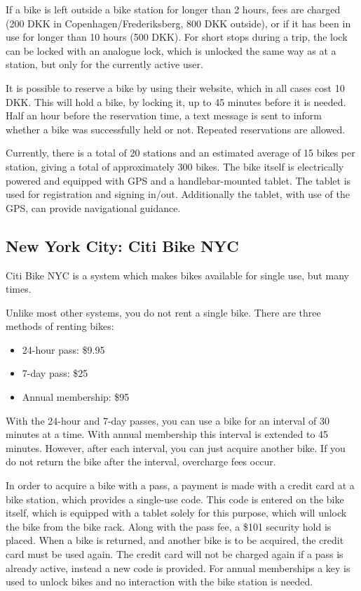 If a bike is left outside a bike station for longer than 2 hours, fees are charged (200 DKK in Copenhagen/Frederiksberg, 800 DKK outside), or if it has been in use for longer than 10 hours (500 DKK).
For short stops during a trip, the lock can be locked with an analogue lock, which is unlocked the same way as at a station, but only for the currently active user.

It is possible to reserve a bike by using their website, which in all cases cost 10 DKK.
This will hold a bike, by locking it, up to 45 minutes before it is needed.
Half an hour before the reservation time, a text message is sent to inform whether a bike was successfully held or not.
Repeated reservations are allowed.

Currently, there is a total of 20 stations and an estimated average of 15 bikes per station, giving a total of approximately 300 bikes.
The bike itself is electrically powered and equipped with GPS and a handlebar-mounted tablet.
The tablet is used for registration and signing in/out.
Additionally the tablet, with use of the GPS, can provide navigational guidance.

\subsection{New York City: Citi Bike NYC}
Citi Bike NYC\cite{nyc_citibike} is a system which makes bikes available for single use, but many times.

Unlike most other systems, you do not rent a single bike.
There are three methods of renting bikes:

\begin{itemize}
\item 24-hour pass: \$9.95
\item 7-day pass: \$25
\item Annual membership: \$95
\end{itemize}

With the 24-hour and 7-day passes, you can use a bike for an interval of 30 minutes at a time.
With annual membership this interval is extended to 45 minutes.
However, after each interval, you can just acquire another bike.
If you do not return the bike after the interval, overcharge fees occur.

In order to acquire a bike with a pass, a payment is made with a credit card at a bike station, which provides a single-use code.
This code is entered on the bike itself, which is equipped with a tablet solely for this purpose, which will unlock the bike from the bike rack.
Along with the pass fee, a \$101 security hold is placed.
When a bike is returned, and another bike is to be acquired, the credit card must be used again.
The credit card will not be charged again if a pass is already active, instead a new code is provided.
For annual memberships a key is used to unlock bikes and no interaction with the bike station is needed.

